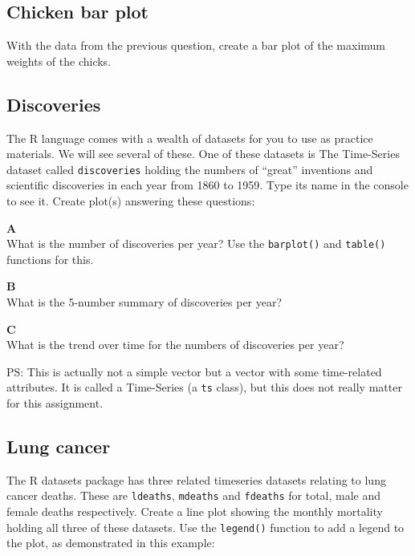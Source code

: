 \documentclass[]{book}
\begin{document}
\hypertarget{chicken-bar-plot}{%
\subsection{Chicken bar plot}\label{chicken-bar-plot}}

With the data from the previous question, create a bar plot of the maximum weights of the chicks.

\hypertarget{discoveries}{%
\subsection{Discoveries}\label{discoveries}}

The R language comes with a wealth of datasets for you to use as practice materials. We will see several of these. One of these datasets is The Time-Series dataset called \texttt{discoveries} holding the numbers of ``great'' inventions and scientific discoveries in each year from 1860 to 1959. Type its name in the console to see it. Create plot(s) answering these questions:

\textbf{A}\\
What is the number of discoveries per year? Use the \texttt{barplot()} and \texttt{table()} functions for this.

\textbf{B}\\
What is the 5-number summary of discoveries per year?

\textbf{C}\\
What is the trend over time for the numbers of discoveries per year?

PS: This is actually not a simple vector but a vector with some time-related attributes. It is called a Time-Series (a \texttt{ts} class), but this does not really matter for this assignment.

\hypertarget{lung-cancer}{%
\subsection{Lung cancer}\label{lung-cancer}}

The R datasets package has three related timeseries datasets relating to lung cancer deaths. These are \texttt{ldeaths}, \texttt{mdeaths} and \texttt{fdeaths} for total, male and female deaths respectively. Create a line plot showing the monthly mortality holding all three of these datasets. Use the \texttt{legend()} function to add a legend to the plot, as demonstrated in this example:
\end{document}
